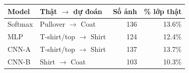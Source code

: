 \begin{tabular}{llrr}
\toprule
Model & Thật $\to$ dự đoán & Số ảnh & \% lớp thật\\
\midrule
Softmax & Pullover $\to$ Coat & 136 & 13.6\%\\
MLP & T-shirt/top $\to$ Shirt & 124 & 12.4\%\\
CNN-A & T-shirt/top $\to$ Shirt & 137 & 13.7\%\\
CNN-B & Shirt $\to$ Coat & 103 & 10.3\%\\
\bottomrule
\end{tabular}
